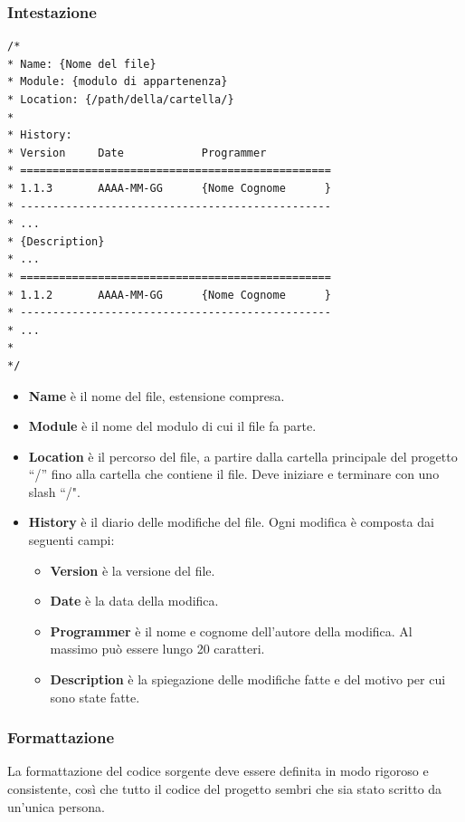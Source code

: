 \subsubsection{Intestazione}

\begin{lstlisting}
/*
* Name: {Nome del file}
* Module: {modulo di appartenenza}
* Location: {/path/della/cartella/}
*
* History:
* Version     Date            Programmer    
* ================================================
* 1.1.3       AAAA-MM-GG      {Nome Cognome      }
* ------------------------------------------------
* ...
* {Description}
* ...
* ================================================
* 1.1.2       AAAA-MM-GG      {Nome Cognome      }
* ------------------------------------------------
* ...
*
*/
\end{lstlisting}

\begin{itemize}
 \item \textbf{Name} è il nome del file, estensione compresa.
 \item \textbf{Module} è il nome del modulo di cui il file fa parte.
 \item \textbf{Location} è il percorso del file, a partire dalla cartella principale del progetto ``/'' fino alla cartella che contiene il file. Deve iniziare e terminare con uno slash ``/".
 \item \textbf{History} è il diario delle modifiche del file. Ogni modifica è composta dai seguenti campi:
 
    \begin{itemize}
     \item \textbf{Version} è la versione del file.
     \item \textbf{Date} è la data della modifica.
     \item \textbf{Programmer} è il nome e cognome dell'autore della modifica. Al massimo può essere lungo 20 caratteri.
     \item \textbf{Description} è la spiegazione delle modifiche fatte e del motivo per cui sono state fatte.    
    \end{itemize}
\end{itemize}

\subsubsection{Formattazione}

La formattazione del codice sorgente deve essere definita in modo rigoroso e consistente, così che tutto il codice del progetto sembri che sia stato scritto da un'unica persona.

